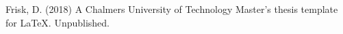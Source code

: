 \begin{thebibliography}{69}

 Frisk, D. (2018) A Chalmers University of Technology Master's thesis template for \LaTeX . Unpublished.

\end{thebibliography}
